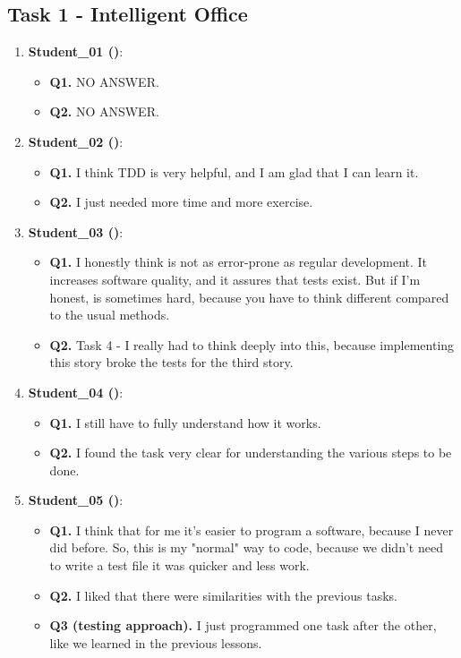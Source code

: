 \subsection{Task 1 - Intelligent Office}
\begin{enumerate}
    \item \textbf{Student\_01 (\tdd)}: 
    \begin{itemize}
        \item \textbf{Q1.} NO ANSWER.
        \item \textbf{Q2.} NO ANSWER.
    \end{itemize}

    \item \textbf{Student\_02 (\tdd)}: 
    \begin{itemize}
        \item \textbf{Q1.} I think TDD is very helpful, and I am glad that I can learn it.
        \item \textbf{Q2.} I just needed more time and more exercise.
    \end{itemize}

    \item \textbf{Student\_03 (\tdd)}: 
    \begin{itemize}
        \item \textbf{Q1.} I honestly think \tdd is not as error-prone as regular development. It increases software quality, and it assures that tests exist. But if I'm honest, \tdd is sometimes hard, because you have to think different compared to the usual methods.
        \item \textbf{Q2.} Task 4 - I really had to think deeply into this, because implementing this story broke the tests for the third story.
    \end{itemize}

    \item \textbf{Student\_04 (\tdd)}: 
    \begin{itemize}
        \item \textbf{Q1.} I still have to fully understand how it works.
        \item \textbf{Q2.} I found the task very clear for understanding the various steps to be done.
    \end{itemize}

    \item \textbf{Student\_05 (\notdd)}: 
    \begin{itemize}
        \item \textbf{Q1.} I think that for me it's easier to program a \notdd software, because I never did \tdd before. So, this is my "normal" way to code, because we didn't need to write a test file it was quicker and less work.
        \item \textbf{Q2.} I liked that there were similarities with the previous tasks.
        \item \textbf{Q3 (\notdd testing approach).} I just programmed one task after the other, like we learned in the previous lessons. 
    \end{itemize}


\end{enumerate}
